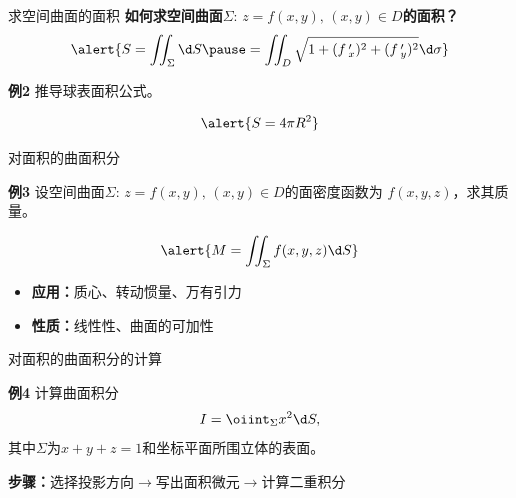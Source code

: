 \begin{frame}{求空间曲面的面积}
	\linespread{1.2}
	{\bf 如何求空间曲面$\Sigma:\,z=f(x,y),\,(x,y)\in D$的面积？\pause }
	$$\alert{S=\iint_{\Sigma}\d S\pause
	=\iint_D\sqrt{1+(f\,'_x)^2+(f\,'_y)^2}\d\sigma}$$\pause 
	\begin{exampleblock}{{\bf 例2}\hfill}
		推导球表面积公式。
	\end{exampleblock}\pause
	$$\alert{S=4\pi R^2}$$
\end{frame}


\begin{frame}{对面积的曲面积分}
	\linespread{1.2}
	\begin{exampleblock}{{\bf 例3}\hfill}
		设空间曲面$\Sigma:\,z=f(x,y),\,(x,y)\in D$的面密度函数为
		$f(x,y,z)$，求其质量。
	\end{exampleblock}\pause 
	$$\alert{M=\iint_{\Sigma}f(x,y,z)\d S}$$\pause 
	\begin{itemize}
	  \item {\bf 应用：}\pause 质心、\pause 转动惯量、\pause 万有引力\pause 
	  \item {\bf 性质：}\pause 线性性、\pause 曲面的可加性
	\end{itemize}
\end{frame}

\begin{frame}{对面积的曲面积分的计算}
	\linespread{1.2}\pause 
	\begin{exampleblock}{{\bf 例4}\hfill}
		计算曲面积分
		$$I=\oiint_{\Sigma}x^2\d S,$$
		其中$\Sigma$为$x+y+z=1$和坐标平面所围立体的表面。
	\end{exampleblock}\pause 
	\alert{{\bf 步骤：}选择投影方向\pause $\to$写出面积微元\pause $\to$计算二重积分}
\end{frame}

